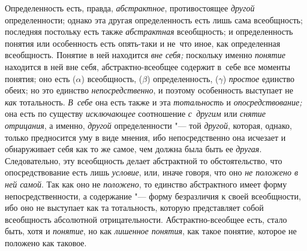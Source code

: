 Определенность есть, правда, {\em абстрактное}, противостоящее {\em другой}
определенности; однако эта другая определенность есть лишь
сама всеобщность; последняя постольку есть также {\em абстрактная}
всеобщность; и определенность понятия или особенность есть
опять-таки и не~что иное, как определенная всеобщность. Понятие в ней
находится {\em вне себя;} поскольку именно {\em понятие} находится в
ней вне себя, абстрактно-всеобщее содержит в~себе все моменты понятия; оно
есть ($\alpha $) всеобщность, ($\beta $) определенность, ($\gamma $)
{\em простое} единство обеих; но это единство {\em непосредственно}, и
поэтому особенность выступает не {\em как} тотальность. {\em В~себе} она есть
также и эта {\em тотальность} и {\em опосредствование;}
она есть по существу {\em исключающее} соотношение {\em с~другим} или
{\em снятие отрицания}, а именно, {\em другой} определенности "--- той
{\em другой}, которая, однако, только предносится уму в виде мнения, ибо
непосредственно она исчезает и обнаруживает себя как то же самое, чем должна
была быть ее {\em другая}. Следовательно, эту всеобщность делает абстрактной
то обстоятельство, что опосредствование есть лишь {\em условие}, или, иначе
говоря, что оно {\em не положено в ней самой}. Так как оно не {\em положено},
то единство абстрактного имеет форму непосредственности, а содержание
"--- форму безразличия к своей всеобщности, ибо оно не выступает
как та тотальность, которую представляет собой всеобщность абсолютной
отрицательности. Абстрактно-всеобщее есть, стало быть, хотя и
{\em понятие}, но как {\em лишенное понятия},
как такое понятие, которое не положено как таковое.

